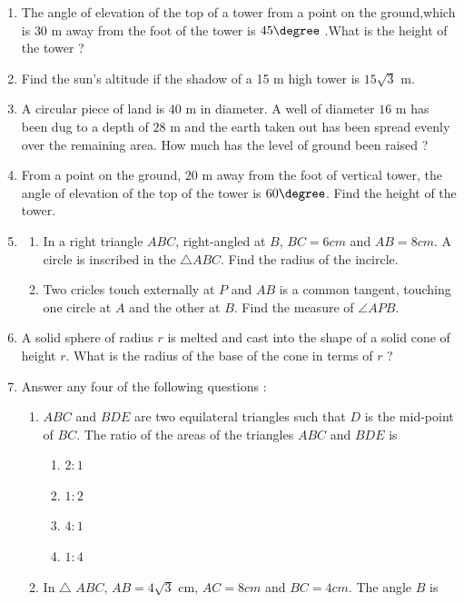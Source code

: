 \begin{enumerate}
	\item The angle of elevation of the top of a tower from a point on the ground,which is $30$ m away from the foot of the tower is $45\degree$ .What is the height of the tower ?
	\item Find the sun's altitude if the shadow of a 15 m high tower is ${15}\sqrt{3}$ m.
	\item A circular piece of land is $40$ m in diameter. A well of diameter $16$ m has been dug to a depth of $28$ m and the earth taken out has been spread evenly over the remaining area. How much has the level of ground been raised ?
	\item From a point on the ground, $20$ m away from the foot of vertical tower, the angle of elevation of the top of the tower is $60\degree$. Find the height of the tower.
	\item
	\begin{enumerate}
		\item In a right triangle $ABC$, right-angled at $B$, $BC= 6 cm$ and $AB = 8 cm$. A circle is inscribed in the ${\triangle} ABC$. Find the radius of the incircle.
		\item Two cricles touch externally at $P$ and $AB$ is a common tangent, touching one circle at $A$ and the other at $B$. Find the measure of $\angle APB$.
	\end{enumerate}
	\item A solid sphere of radius $r$ is melted and cast into the shape of a solid cone of height $r$. What is the radius of the base of the cone in terms of $r$ ?
	\item Answer any four of the following questions :
		\begin{enumerate}[label=(\roman*)]
			\item $ABC$ and $BDE$ are two equilateral triangles such that $D$ is the mid-point of $BC$. The ratio of the areas of the triangles $ABC$ and $BDE$ is
				\begin{enumerate}[label=(\Alph*)]
					\item $2 : 1$
					\item $1 : 2$
					\item $4 : 1$
					\item $1 : 4$
				\end{enumerate}
			\item In $\triangle$ $ABC$, $AB = {4\sqrt{3}}$ cm, $AC = 8 cm$ and $BC = 4 cm$. The angle $B$ is
				\begin{enumerate}[label=(\Alph*)]

\end{enumerate}
\end{enumerate}
\end{enumerate}
